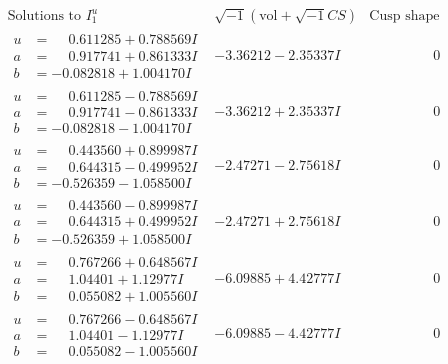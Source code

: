 \documentclass[1p]{elsarticle_modified}
\theoremstyle{definition}
\newcommand{\I}{\sqrt{-1}}
\begin{document}
$$\begin{array}{c|c|c}  
\text{Solutions to }I^u_{1}& \I (\text{vol} + \sqrt{-1}CS) & \text{Cusp shape}\\
 \hline 
\begin{aligned}
u &= \phantom{-}0.611285 + 0.788569 I \\
a &= \phantom{-}0.917741 + 0.861333 I \\
b &= -0.082818 + 1.004170 I\end{aligned}
 & -3.36212 - 2.35337 I & \phantom{-0.000000 } 0 \\ \hline\begin{aligned}
u &= \phantom{-}0.611285 - 0.788569 I \\
a &= \phantom{-}0.917741 - 0.861333 I \\
b &= -0.082818 - 1.004170 I\end{aligned}
 & -3.36212 + 2.35337 I & \phantom{-0.000000 } 0 \\ \hline\begin{aligned}
u &= \phantom{-}0.443560 + 0.899987 I \\
a &= \phantom{-}0.644315 - 0.499952 I \\
b &= -0.526359 - 1.058500 I\end{aligned}
 & -2.47271 - 2.75618 I & \phantom{-0.000000 } 0 \\ \hline\begin{aligned}
u &= \phantom{-}0.443560 - 0.899987 I \\
a &= \phantom{-}0.644315 + 0.499952 I \\
b &= -0.526359 + 1.058500 I\end{aligned}
 & -2.47271 + 2.75618 I & \phantom{-0.000000 } 0 \\ \hline\begin{aligned}
u &= \phantom{-}0.767266 + 0.648567 I \\
a &= \phantom{-}1.04401 + 1.12977 I \\
b &= \phantom{-}0.055082 + 1.005560 I\end{aligned}
 & -6.09885 + 4.42777 I & \phantom{-0.000000 } 0 \\ \hline\begin{aligned}
u &= \phantom{-}0.767266 - 0.648567 I \\
a &= \phantom{-}1.04401 - 1.12977 I \\
b &= \phantom{-}0.055082 - 1.005560 I\end{aligned}
 & -6.09885 - 4.42777 I & \phantom{-0.000000 } 0 \\ \hline\begin{aligned}

\end{aligned}
\end{array}$$
\end{document}
